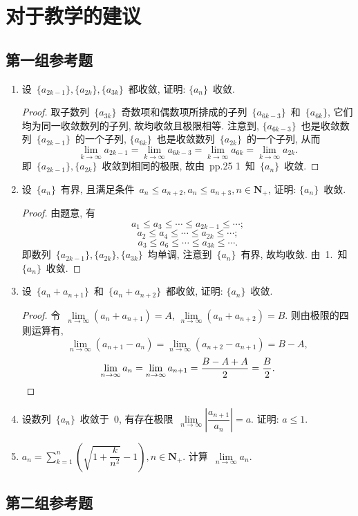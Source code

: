 \documentclass[UTF8,a4paper,10pt,twoside]{book}
\begin{document}
\section{对于教学的建议}
\subsection{第一组参考题}
\begin{enumerate}
	\item 设~$\{a_{2k-1}\}, \{a_{2k}\}, \{a_{3k}\}$~都收敛, 证明: $\{a_n\}$~收敛.
	      \begin{proof}
		      取子数列~$\{a_{3k}\}$~奇数项和偶数项所排成的子列~$\{a_{6k-3}\}$~和~$\{a_{6k}\}$, 它们均为同一收敛数列的子列, 故均收敛且极限相等. 注意到, $\{a_{6k-3}\}$~也是收敛数列~$\{a_{2k-1}\}$~的一个子列, $\{a_{6k}\}$~也是收敛数列~$\{a_{2k}\}$~的一个子列, 从而
		      \[
			      \lim\limits_{k\to\infty} a_{2k-1}=\lim\limits_{k\to\infty} a_{6k-3}=\lim\limits_{k\to\infty} a_{6k}=\lim\limits_{k\to\infty} a_{2k}.
		      \]
		      即~$\{a_{2k-1}\}, \{a_{2k}\}$~收敛到相同的极限, 故由~pp.25 1~知~$\{a_n\}$~收敛. \qedhere
	      \end{proof}

	\item 设~$\{a_n\}$~有界, 且满足条件~$a_n\leqslant a_{n+2}, a_n\leqslant a_{n+3}, n\in\mathbf{N}_{+}$, 证明: $\{a_n\}$~收敛.
	\begin{proof}
		由题意, 有
		\[
			a_1\leqslant a_3\leqslant\cdots\leqslant a_{2k-1}\leqslant\cdots;
		\]
		\[
			a_2\leqslant a_4\leqslant\cdots\leqslant a_{2k}\leqslant\cdots;
		\]
		\[
			a_3\leqslant a_6\leqslant\cdots\leqslant a_{3k}\leqslant\cdots.
		\]
		即数列~$\{a_{2k-1}\}, \{a_{2k}\}, \{a_{3k}\}$~均单调, 注意到~$\{a_n\}$~有界, 故均收敛. 由~1.~知~$\{a_n\}$~收敛.\qedhere
	\end{proof}

	\item 设~$\{a_n+a_{n+1}\}$~和~$\{a_n+a_{n+2}\}$~都收敛, 证明: $\{a_n\}$~收敛.
	\begin{proof}
		令~$\lim\limits_{n\to\infty} (a_n+a_{n+1})=A$, $\lim\limits_{n\to\infty} (a_n+a_{n+2})=B$. 则由极限的四则运算有, 
		\[
			\lim\limits_{n\to\infty} (a_{n+1}-a_{n})=\lim\limits_{n\to\infty} (a_{n+2}-a_{n+1})=B-A,
		\]
		\[
			\lim\limits_{n\to\infty} a_n=\lim\limits_{n\to\infty} a_{n+1}=\dfrac{B-A+A}{2}=\dfrac{B}{2}.\qedhere
		\]
	\end{proof}

	\item 设数列~$\{a_n\}$~收敛于~$0$, 有存在极限~$\lim\limits_{n\to\infty} \left|\dfrac{a_{n+1}}{a_n}\right|=a$. 证明: $a\leqslant 1$.

	\item $a_n=\sum\limits_{k=1}^n\left(\sqrt{1+\dfrac{k}{n^2}}-1\right), n\in\mathbf{N}_{+}$. 计算~$\lim\limits_{n\to\infty} a_n$.
\end{enumerate}
\subsection{第二组参考题}
\end{document}
